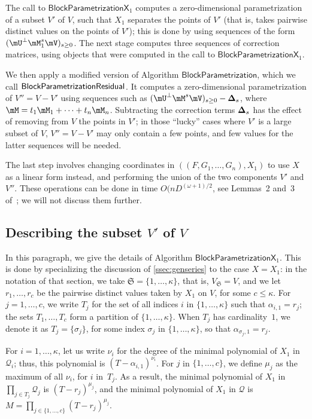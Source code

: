 \documentclass[12pt]{article}
\newcommand{\mat}[1]{\bm{\MakeUppercase{#1}}} %
\newcommand{\mainalgoname}{\mathsf{ BlockParametrization}}
\newcommand{\lf}{X}
\newcommand{\residueI}{\mathscr{Q}}
\def\dg{\kappa}
\begin{document}
The call to $\mathsf{BlockParametrizationX}_1$ computes a zero-dimensional
parametrization of a subset $V'$ of $V$, such that $X_1$ separates the
points of $V'$ (that is, takes pairwise distinct values on the points
of $V'$); this is done by using sequences of the form $(\mU^\perp
\mM_1^s \mV)_{s \ge 0}$. The next stage computes three 
sequences of correction matrices, using objects that were computed 
in the call to  $\mathsf{BlockParametrizationX}_1$.

We then apply a modified version of Algorithm $\mainalgoname$, which we call
$\mainalgoname{\sf Residual}$. It computes a zero-dimensional
parametrization of $V''=V-V'$ using sequences such as $(\mU^\perp
\mM^s \mV)_{s \ge 0} - \mat{\Delta}_s$, where $\mM= t_1 \mM_1 + \cdots
+ t_n \mM_n$. Subtracting the correction terms $\mat{\Delta}_s$ has
the effect of removing from $V$ the points in $V'$; in those ``lucky''
cases where $V'$ is a large subset of $V$, $V''=V-V'$ may only contain
a few points, and few values for the latter sequences will be needed.

The last step involves changing coordinates in
$((F,G_1,\dots,G_n),X_1)$ to use $\lf$ as a linear form instead, and
performing the union of the two components $V'$ and $V''$. These
operations can be done in time $O(n D^{(\omega+1)/2}$, see Lemmas~2
and~3 of~\cite{PoSc13b}; we will not discuss them further.


\subsection{Describing the subset \texorpdfstring{$V'$}{V'} of \texorpdfstring{$V$}{V}}

In this paragraph, we give the details of Algorithm
$\mathsf{BlockParametrizationX}_1$. This is done by specializing the
discussion of \cref{ssec:genseries} to the case $\lf=X_1$:
in the notation of that section, we take
$\mathfrak{S}=\{1,\dots,\dg\}$, that is, $V_{\mathfrak{S}}=V$, and we
let $r_1,\dots,r_c$ be the pairwise distinct values taken by $X_1$ on
$V$, for some $c \le \dg$.  For $j=1,\dots,c$, we write $T_j$ for the
set of all indices $i$ in $\{1,\dots,\dg\}$ such that
$\alpha_{i,1}=r_j$; the sets $T_1,\dots,T_c$ form a partition of
$\{1,\dots,\dg\}$. When $T_j$ has cardinality~$1$, we denote it as
$T_j=\{\sigma_j\}$, for some index $\sigma_j$ in $\{1,\dots,\dg\}$, so
that $\alpha_{\sigma_j,1}=r_j$.

For $i=1,\dots,\dg$, let us write $\nu_i$ for the degree of the minimal
polynomial of $X_1$ in $\residueI_i$; thus, this polynomial is
$(T-\alpha_{i,1})^{\nu_i}$. For $j$ in $\{1,\dots,c\}$, we define
$\mu_j$ as the maximum of all $\nu_i$, for $i$ in~$T_j$. As a result, the minimal
polynomial of $X_1$ in $\prod_{j \in T_j} \residueI_j$ is 
$(T-r_j)^{\mu_j}$, and the minimal polynomial of $X_1$ in $\residueI$ is
$M=\prod_{j \in \{1,\dots,c\}} (T-r_j)^{\mu_j}$.
\end{document}
